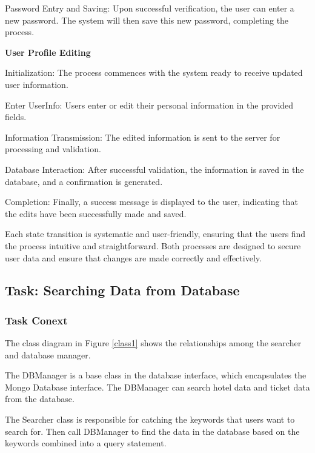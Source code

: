 \documentclass[conference]{IEEEtran}
\begin{document}
Password Entry and Saving: Upon successful verification, the user can enter a new password. The system will then save this new password, completing the process.

\textbf{ User Profile Editing}

Initialization: The process commences with the system ready to receive updated user information.

Enter UserInfo: Users enter or edit their personal information in the provided fields.

Information Transmission: The edited information is sent to the server for processing and validation.

Database Interaction: After successful validation, the information is saved in the database, and a confirmation is generated.

Completion: Finally, a success message is displayed to the user, indicating that the edits have been successfully made and saved.

Each state transition is systematic and user-friendly, ensuring that the users find the process intuitive and straightforward. Both processes are designed to secure user data and ensure that changes are made correctly and effectively.



\subsection{\textbf{Task: Searching Data from Database }}


\subsubsection{\textbf{Task Conext }}

\textbf{}

The class diagram in Figure \ref{class1} shows the relationships among the searcher and database manager. 

The DBManager is a base class in the database interface, which encapsulates the Mongo Database interface. The DBManager can search hotel data and ticket data from the database.

The Searcher class is responsible for catching the keywords that users want to search for. Then call DBManager to find the data in the database based on the keywords combined into a query statement.
\end{document}
